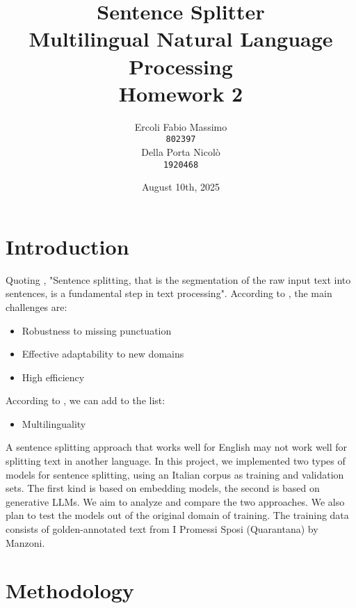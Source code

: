 \documentclass[11pt]{article}
\title{
	Sentence Splitter\\
	\large Multilingual Natural Language Processing \\
	Homework 2}
\date{August 10th, 2025}
\author{Ercoli Fabio Massimo \\
\texttt{802397} \\\And
Della Porta Nicolò \\
\texttt{1920468} \\}
\begin{document}
\maketitle

\section{Introduction}

Quoting \cite{redaelli-sprugnoli-2024-sentence}, "Sentence splitting, that is the segmentation of the raw input text into sentences, is a fundamental step in text processing".  According to \cite{frohmann2024segmenttextuniversalapproach}, the main challenges are:
\begin{itemize}
	\item Robustness to missing punctuation
	\item Effective adaptability to new domains
	\item High efficiency
\end{itemize}
According to \cite{redaelli-sprugnoli-2024-sentence}, we can add to the list:
\begin{itemize}
	\item Multilinguality
\end{itemize}
A sentence splitting approach that works well for English may not work well for splitting text in another language. \newline In this project, we implemented two types of models for sentence splitting, using an Italian corpus as training and validation sets.
The first kind is based on embedding models, the second is based on generative LLMs.
We aim to analyze and compare the two approaches. 
We also plan to test the models out of the original domain of training. 
The training data consists of golden-annotated text from I Promessi Sposi (Quarantana) by Manzoni.

\section{Methodology}
\end{document}
